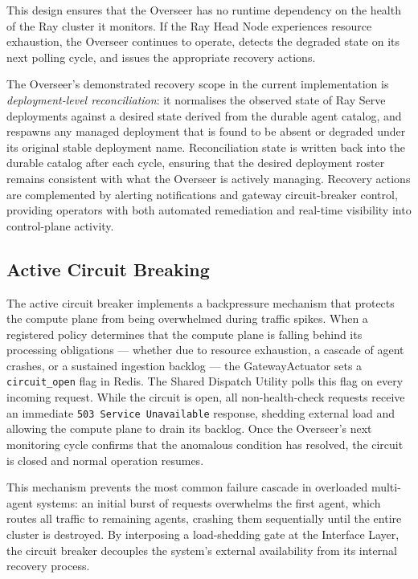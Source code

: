 \documentclass[12pt, a4paper]{report}
\begin{document}
This design ensures that the Overseer has no runtime dependency on the health of the
Ray cluster it monitors.
If the Ray Head Node experiences resource exhaustion, the Overseer continues to
operate, detects the degraded state on its next polling cycle, and issues the
appropriate recovery actions.

The Overseer's demonstrated recovery scope in the current implementation is
\emph{deployment-level reconciliation}: it normalises the observed state of Ray Serve
deployments against a desired state derived from the durable agent catalog, and
respawns any managed deployment that is found to be absent or degraded under its
original stable deployment name.
Reconciliation state is written back into the durable catalog after each cycle,
ensuring that the desired deployment roster remains consistent with what the Overseer
is actively managing.
Recovery actions are complemented by alerting notifications and gateway circuit-breaker
control, providing operators with both automated remediation and real-time visibility
into control-plane activity.

\subsection{Active Circuit Breaking}
\label{ssec:circuit_breaker}

The active circuit breaker implements a backpressure mechanism that protects the compute
plane from being overwhelmed during traffic spikes.
When a registered policy determines that the compute plane is falling behind its
processing obligations — whether due to resource exhaustion, a cascade of agent crashes,
or a sustained ingestion backlog — the GatewayActuator sets a \texttt{circuit\_open}
flag in Redis.
The Shared Dispatch Utility polls this flag on every incoming request.
While the circuit is open, all non-health-check requests receive an immediate
\texttt{503 Service Unavailable} response, shedding external load and allowing the
compute plane to drain its backlog.
Once the Overseer's next monitoring cycle confirms that the anomalous condition has
resolved, the circuit is closed and normal operation resumes.

This mechanism prevents the most common failure cascade in overloaded multi-agent systems:
an initial burst of requests overwhelms the first agent, which routes all traffic to
remaining agents, crashing them sequentially until the entire cluster is destroyed.
By interposing a load-shedding gate at the Interface Layer, the circuit breaker
decouples the system's external availability from its internal recovery process.
\end{document}
